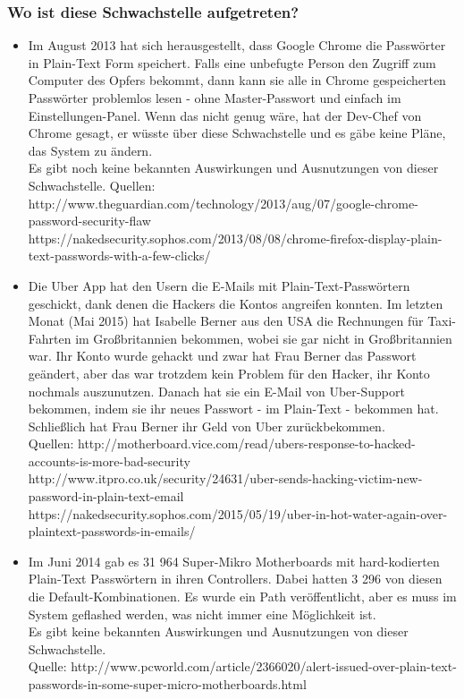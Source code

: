 \documentclass[12pt,a4paper,titlepage,oneside]{scrartcl}
\begin{document}
\subsubsection{Wo ist diese Schwachstelle aufgetreten?}

\begin{itemize}
\item Im August 2013 hat sich herausgestellt, dass Google Chrome die Passwörter in Plain-Text Form speichert.
	Falls eine unbefugte Person den Zugriff zum Computer des Opfers bekommt, dann kann sie alle in Chrome gespeicherten Passwörter problemlos lesen -
	ohne Master-Passwort und einfach im Einstellungen-Panel. Wenn das nicht genug wäre, hat der Dev-Chef von Chrome gesagt,
	er wüsste über diese Schwachstelle und es gäbe keine Pläne, das System zu ändern. \\
	Es gibt noch keine bekannten Auswirkungen und Ausnutzungen von dieser Schwachstelle.
	Quellen: http://www.theguardian.com/technology/2013/aug/07/google-chrome-password-security-flaw \\
	https://nakedsecurity.sophos.com/2013/08/08/chrome-firefox-display-plain-text-passwords-with-a-few-clicks/
\item Die Uber App hat den Usern die E-Mails mit Plain-Text-Passwörtern geschickt, dank denen die Hackers
	die Kontos angreifen konnten. Im letzten Monat (Mai 2015) hat Isabelle Berner aus den USA
	die Rechnungen für Taxi-Fahrten im Großbritannien bekommen, wobei sie gar nicht in Großbritannien war.
	Ihr Konto wurde gehackt und zwar hat Frau Berner das Passwort geändert, aber das war trotzdem kein Problem
	für den Hacker, ihr Konto nochmals auszunutzen. Danach hat sie ein E-Mail von Uber-Support bekommen,
	indem sie ihr neues Passwort - im Plain-Text - bekommen hat. Schließlich hat Frau Berner ihr Geld von Uber zurückbekommen. \\
	Quellen: http://motherboard.vice.com/read/ubers-response-to-hacked-accounts-is-more-bad-security \\
	http://www.itpro.co.uk/security/24631/uber-sends-hacking-victim-new-password-in-plain-text-email \\
	https://nakedsecurity.sophos.com/2015/05/19/uber-in-hot-water-again-over-plaintext-passwords-in-emails/
\item Im Juni 2014 gab es 31 964 Super-Mikro Motherboards mit hard-kodierten Plain-Text Passwörtern
	in ihren Controllers. Dabei hatten 3 296 von diesen die Default-Kombinationen. Es wurde ein Path
	veröffentlicht, aber es muss im System geflashed werden, was nicht immer eine Möglichkeit ist. \\
	Es gibt keine bekannten Auswirkungen und Ausnutzungen von dieser Schwachstelle. \\
	Quelle: http://www.pcworld.com/article/2366020/alert-issued-over-plain-text-passwords-in-some-super-micro-motherboards.html
\end{itemize}
\end{document}

